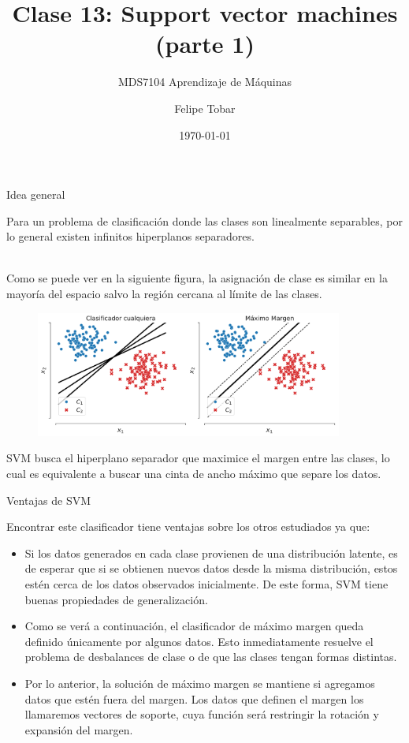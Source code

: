 \documentclass[handout, 9pt]{beamer}
\title{Clase 13: Support vector machines (parte 1)}
\subtitle{MDS7104 Aprendizaje de Máquinas}
\date{\today}
\author{Felipe Tobar}
\institute{Iniciativa de Datos e Inteligencia Artificial\\Universidad de Chile}
\begin{document}
\begin{frame}
  \titlepage
\end{frame}

\begin{frame}{Idea general}

Para un problema de clasificación donde las clases son linealmente separables, por lo general existen infinitos hiperplanos separadores.\\~\ \pause

Como se puede ver en la siguiente figura, la asignación de clase es similar en la mayoría del espacio salvo la región cercana al límite de las clases.

\begin{figure}[ht]
    \centering
    \includegraphics[width=0.9\textwidth]{../img/cap5_max_margen.pdf}
\end{figure}\pause

SVM busca el hiperplano separador que maximice el margen entre las clases, lo cual es equivalente a buscar una cinta de ancho máximo que separe los datos.
	
\end{frame}


\begin{frame}{Ventajas de SVM}

Encontrar este clasificador tiene ventajas sobre los otros estudiados ya que:

\begin{itemize}
	\item Si los datos generados en cada clase provienen de una distribución latente, es de esperar que si se obtienen nuevos datos desde la misma distribución, estos estén cerca de los datos observados inicialmente. De este forma, SVM tiene buenas propiedades de generalización.\pause
	\item Como se verá a continuación, el clasificador de máximo margen queda definido únicamente por algunos datos. Esto inmediatamente resuelve el problema de desbalances de clase o de que las clases tengan formas distintas.\pause
	\item Por lo anterior, la solución de máximo margen se mantiene si agregamos datos que estén fuera del margen. Los datos que definen el margen los llamaremos vectores de soporte, cuya función será restringir la rotación y expansión del margen.
\end{itemize}
	
\end{frame}
\end{document}
